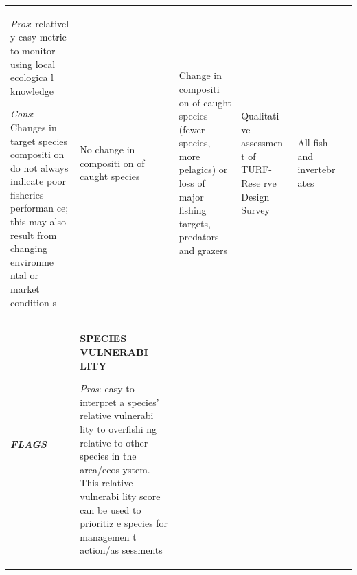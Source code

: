 \documentclass[]{book}
\begin{document}
\begin{longtable}[]{@{}llllll@{}}
\begin{minipage}[t]{0.16\columnwidth}
\emph{Pros}: relativel y easy metric to monitor using local ecologica l
knowledge

\emph{Cons}: Changes in target species compositi on do not always
indicate poor fisheries performan ce; this may also result from changing
environme ntal or market condition s\strut
\end{minipage} & \begin{minipage}[t]{0.16\columnwidth}\raggedright\strut
No change in compositi on of caught species\strut
\end{minipage} & \begin{minipage}[t]{0.16\columnwidth}\raggedright\strut
Change in compositi on of caught species (fewer species, more pelagics)
or loss of major fishing targets, predators and grazers\strut
\end{minipage} & \begin{minipage}[t]{0.16\columnwidth}\raggedright\strut
Qualitati ve assessmen t of TURF-Rese rve Design Survey\strut
\end{minipage} & \begin{minipage}[t]{0.16\columnwidth}\raggedright\strut
All fish and invertebr ates\strut
\end{minipage}\tabularnewline
\begin{minipage}[t]{0.16\columnwidth}\raggedright\strut
\textbf{\emph{FLAGS} }\strut
\end{minipage} & \begin{minipage}[t]{0.16\columnwidth}\raggedright\strut
\textbf{SPECIES VULNERABI LITY}

\emph{Pros}: easy to interpret a species' relative vulnerabi lity to
overfishi ng relative to other species in the area/ecos ystem. This
relative vulnerabi lity score can be used to prioritiz e species for
managemen t action/as sessments


\end{minipage}
\end{longtable}
\end{document}
